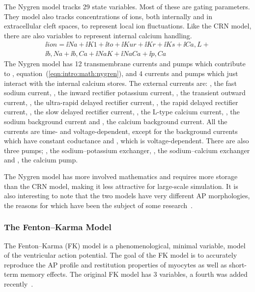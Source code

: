 The Nygren model tracks 29 state variables.
Most of these are gating parameters.
They model also tracks concentrations of ions, both internally and in
extracellular cleft spaces, to represent local ion fluctuations.
Like the CRN model, there are also variables to represent internal calcium
handling.
\begin{align}
\label{eqn:intro:math:nygren}
\ii{ion} = \ii{Na} + \ii{K1} + \ii{to} + \ii{Kur} + \ii{Kr} + \ii{Ks} + 
\ii{Ca,L} + \nonumber \\
\ii{b,Na} + \ii{b,Ca} + \ii{NaK} + \ii{NaCa} + \ii{p,Ca}
\end{align}
The Nygren model has 12 transmembrane currents and pumps which contribute to ,
equation~(\ref{eqn:intro:math:nygren}), and 4 currents and
pumps which just interact with the internal calcium stores.
The external currents are: , the fast sodium current, , the inward
rectifier potassium current, , the transient outward current, , the
ultra-rapid delayed rectifier current, , the rapid delayed rectifier
current, , the slow delayed rectifier current, , the L-type
calcium current, , the sodium background current and , the
calcium background current.
All the currents are time- and voltage-dependent, except for the background
currents which have constant coductance and , which is voltage-dependent.
There are also three pumps; , the sodium--potassium exchanger,
, the sodium--calcium exchanger and , the calcium pump.

The Nygren model has more involved mathematics and requires more storage than
the CRN model, making it less attractive for large-scale simulation.
It is also interesting to note that the two models have very different
AP morphologies, the reasons for which have been the subject of some
research~\cite{Nygren2001,Syed2005,Cherry2008}.

\subsubsection{The Fenton--Karma Model}
\label{sec:intro:math:fk}

The Fenton--Karma (FK) model is a
phenomenological, minimal variable, model of the ventricular action
potential.
The goal of the FK model is to accurately reproduce the AP profile and
restitution properties of myocytes as well as short-term memory effects.
The original FK model has 3 variables, a fourth was added
recently~\cite{Fenton1998,Bueno-Orovio2008}.

